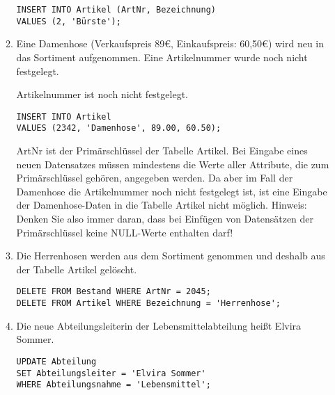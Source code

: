 \documentclass{lehramt-informatik-aufgabe}
\begin{document}
\begin{enumerate}
\begin{enumerate}
\begin{antwort}[muster]
\begin{verbatim}
INSERT INTO Artikel (ArtNr, Bezeichnung)
VALUES (2, 'Bürste');
\end{verbatim}
\end{antwort}


\item Eine Damenhose (Verkaufspreis 89€, Einkaufspreis: 60,50€) wird
neu in das Sortiment aufgenommen. Eine Artikelnummer wurde noch nicht
festgelegt.

\begin{antwort}[falsch]
Artikelnummer ist noch nicht festgelegt.
\begin{verbatim}
INSERT INTO Artikel
VALUES (2342, 'Damenhose', 89.00, 60.50);
\end{verbatim}
\end{antwort}

\begin{antwort}[muster]
ArtNr ist der Primärschlüssel der Tabelle Artikel. Bei Eingabe eines
neuen Datensatzes müssen mindestens die Werte aller Attribute, die zum
Primärschlüssel gehören, angegeben werden. Da aber im Fall der Damenhose
die Artikelnummer noch nicht festgelegt ist, ist eine Eingabe der
Damenhose-Daten in die Tabelle Artikel nicht möglich. Hinweis: Denken
Sie also immer daran, dass bei Einfügen von Datensätzen der
Primärschlüssel keine NULL-Werte enthalten darf!
\end{antwort}


\item Die Herrenhosen werden aus dem Sortiment genommen und deshalb aus
der Tabelle Artikel gelöscht.

\begin{antwort}
\begin{verbatim}
DELETE FROM Bestand WHERE ArtNr = 2045;
DELETE FROM Artikel WHERE Bezeichnung = 'Herrenhose';
\end{verbatim}
\end{antwort}


\item Die neue Abteilungsleiterin der Lebensmittelabteilung heißt Elvira
Sommer.

\begin{antwort}[muster]
\begin{verbatim}
UPDATE Abteilung
SET Abteilungsleiter = 'Elvira Sommer'
WHERE Abteilungsnahme = 'Lebensmittel';
\end{verbatim}
\end{antwort}


\end{enumerate}
\end{enumerate}
\end{document}
